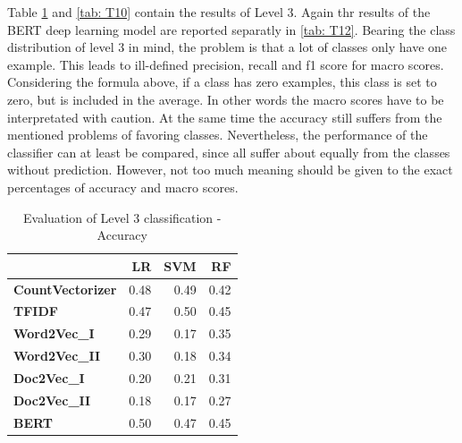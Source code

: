 \documentclass[12pt, a4paper, titlepage]{article}
\begin{document}
Table \ref{tab: T8} and \ref{tab: T10} contain the results of Level 3. Again thr results of the \ac{BERT} deep learning model are reported separatly in \ref{tab: T12}. Bearing the class distribution of level 3 in mind, the problem is that a lot of classes only have one example. This leads to ill-defined precision, recall and f1 score for macro scores. Considering the formula above, if a class has zero examples, this class is set to zero, but is included in the average. In other words the macro scores have to be interpretated with caution. At the same time the accuracy still suffers from the mentioned problems of favoring classes. Nevertheless, the performance of the classifier can at least be compared, since all suffer about equally from the classes without prediction. However, not too much meaning should be given to the exact percentages of accuracy and macro scores. 


\begin{table}[hb!]
  \center
\begin{tabular}{lrrr}
\hline
{} &   \textbf{LR} &   \textbf{SVM} &    \textbf{RF} \\
\hline
\textbf{CountVectorizer} &  0.48 &  0.49 &  0.42 \\
\textbf{TFIDF}           &  0.47 &  0.50 &  0.45 \\
\textbf{Word2Vec\_I}      &  0.29 &  0.17 &  0.35 \\
\textbf{Word2Vec\_II}     &  0.30 &  0.18 &  0.34 \\
\textbf{Doc2Vec\_I}       &  0.20 &  0.21 &  0.31 \\
\textbf{Doc2Vec\_II}      &  0.18 &  0.17 &  0.27 \\
\textbf{BERT}            &  0.50 &  0.47 &  0.45 \\
\hline
\end{tabular}
\caption{\label{tab: T8} Evaluation of Level 3 classification - Accuracy}
\end{table}
\end{document}
